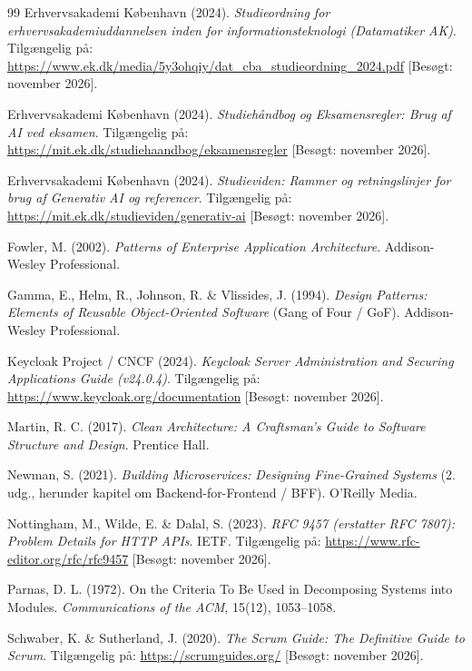 \documentclass[11pt,a4paper]{article}
\begin{document}
\begin{table}[htbp]
\begin{table}[htbp]
\begin{thebibliography}{99}
Erhvervsakademi København (2024). \textit{Studieordning for erhvervsakademiuddannelsen inden for informationsteknologi (Datamatiker AK)}. Tilgængelig på: \url{https://www.ek.dk/media/5y3ohqiy/dat_cba_studieordning_2024.pdf} [Besøgt: november 2026].

Erhvervsakademi København (2024). \textit{Studiehåndbog og Eksamensregler: Brug af AI ved eksamen}. Tilgængelig på: \url{https://mit.ek.dk/studiehaandbog/eksamensregler} [Besøgt: november 2026].

Erhvervsakademi København (2024). \textit{Studieviden: Rammer og retningslinjer for brug af Generativ AI og referencer}. Tilgængelig på: \url{https://mit.ek.dk/studieviden/generativ-ai} [Besøgt: november 2026].

Fowler, M. (2002). \textit{Patterns of Enterprise Application Architecture}. Addison-Wesley Professional.

Gamma, E., Helm, R., Johnson, R. \& Vlissides, J. (1994). \textit{Design Patterns: Elements of Reusable Object-Oriented Software} (Gang of Four / GoF). Addison-Wesley Professional.

Keycloak Project / CNCF (2024). \textit{Keycloak Server Administration and Securing Applications Guide (v24.0.4)}. Tilgængelig på: \url{https://www.keycloak.org/documentation} [Besøgt: november 2026].

Martin, R. C. (2017). \textit{Clean Architecture: A Craftsman's Guide to Software Structure and Design}. Prentice Hall.

Newman, S. (2021). \textit{Building Microservices: Designing Fine-Grained Systems} (2. udg., herunder kapitel om Backend-for-Frontend / BFF). O'Reilly Media.

Nottingham, M., Wilde, E. \& Dalal, S. (2023). \textit{RFC 9457 (erstatter RFC 7807): Problem Details for HTTP APIs}. IETF. Tilgængelig på: \url{https://www.rfc-editor.org/rfc/rfc9457} [Besøgt: november 2026].

Parnas, D. L. (1972). On the Criteria To Be Used in Decomposing Systems into Modules. \textit{Communications of the ACM}, 15(12), 1053--1058.

Schwaber, K. \& Sutherland, J. (2020). \textit{The Scrum Guide: The Definitive Guide to Scrum}. Tilgængelig på: \url{https://scrumguides.org/} [Besøgt: november 2026].


\end{thebibliography}
\end{table}
\end{table}
\end{document}
